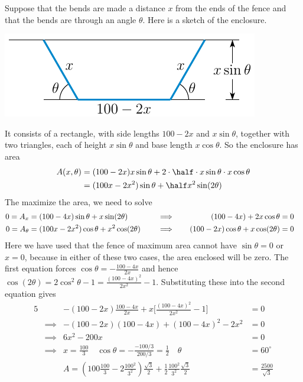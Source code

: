\begin{solution}
Suppose that the bends are made a  distance $x$ from the ends of the fence
and that the bends are through an angle $\theta$.
Here is a sketch of the enclosure.
\begin{center}
     \includegraphics{fig/fence.pdf}
\end{center}
It consists of a rectangle, with side lengths $100-2x$ and
$x\sin\theta$, together with two triangles, each of height $x\sin\theta$
and base length $x\cos\theta$. So the enclosure has area
\begin{align*}
A(x,\theta)&=(100-2x)x\sin\theta+2\cdot\half\cdot x\sin\theta\cdot x\cos\theta\\
&=(100x-2x^2)\sin\theta+\half x^2\sin(2\theta)
\end{align*}
The maximize the area, we need to solve
\begin{alignat*}{5}
0=A_x&=(100-4x)\sin\theta+x\sin(2\theta) & &\implies &
(100-4x)+2x\cos\theta&=0\cr
0=A_\theta&=(100x-2x^2)\cos\theta+x^2\cos(2\theta)\quad & &\implies\quad &
(100-2x)\cos\theta+x\cos(2\theta)&=0
\end{alignat*}
Here we have used that the fence of maximum area cannot have $\sin\theta=0$
or $x=0$, because in either of these two cases, the area enclosed will be zero. 
The first equation forces $\cos\theta=-\frac{100-4x}{2x}$
and hence $\cos(2\theta)=2\cos^2\theta-1=\frac{(100-4x)^2}{2x^2}-1$. 
Substituting these into the second equation gives
\begin{alignat*}{5}
& & -(100-2x)\frac{100-4x}{2x}+x\Big[\frac{(100-4x)^2}{2x^2}-1\Big]&=0 \\
&\implies & -(100-2x)(100-4x)+(100-4x)^2-2x^2&=0 \\
&\implies & 6x^2-200x&=0 \\
&\implies & x=\frac{100}{3}
\quad\cos\theta=-\frac{-100/3}{200/3}=\frac{1}{2}\quad
\theta&=60^\circ\\
& & A= \left(100\frac{100}{3}-2\frac{100^2}{3^2}\right)
             \frac{\sqrt{3}}{2}+\frac{1}{2} \frac{100^2}{3^2}\frac{\sqrt{3}}{2}
&=\frac{2500}{\sqrt{3}}
\end{alignat*}
\end{solution}

